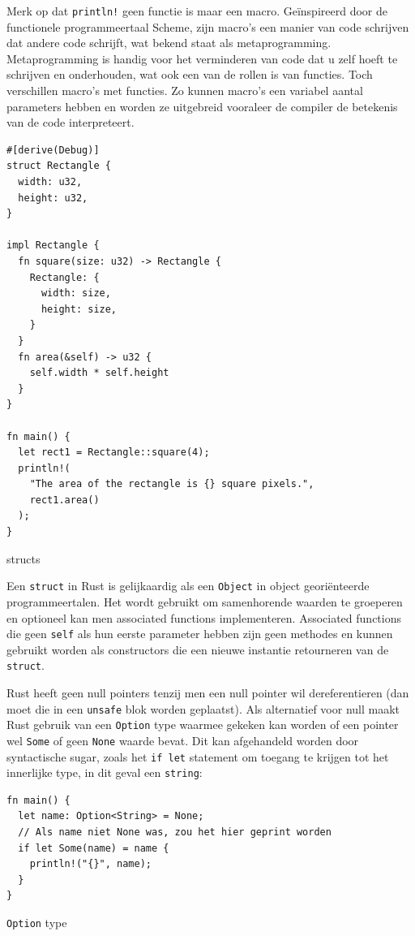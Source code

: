 \clearpage

Merk op dat \texttt{println!} geen functie is maar een macro. Geïnspireerd door de
functionele programmeertaal Scheme, zijn macro’s een manier van code schrijven dat andere code
schrijft, wat bekend staat als metaprogramming. Metaprogramming is handig voor het verminderen van
code dat u zelf hoeft te schrijven en onderhouden, wat ook een van de rollen is van functies. Toch
verschillen macro’s met functies. Zo kunnen macro’s een variabel aantal parameters hebben en worden
ze uitgebreid vooraleer de compiler de betekenis van de code interpreteert.

\begin{listing}[h]
\begin{verbatim}
#[derive(Debug)]
struct Rectangle {
  width: u32,
  height: u32,
}

impl Rectangle {
  fn square(size: u32) -> Rectangle {
    Rectangle: {
      width: size,
      height: size,
    }
  }
  fn area(&self) -> u32 {
    self.width * self.height
  }
}

fn main() {
  let rect1 = Rectangle::square(4);
  println!(
    "The area of the rectangle is {} square pixels.",
    rect1.area()
  );
}

\end{verbatim}
\caption{structs}
\end{listing}

Een \texttt{struct} in Rust is gelijkaardig als een \texttt{Object} in object
georiënteerde programmeertalen. Het wordt gebruikt om samenhorende waarden te groeperen en optioneel
kan men associated functions implementeren. Associated functions die geen \texttt{self}
als hun eerste parameter hebben zijn geen methodes en kunnen gebruikt worden als constructors die
een nieuwe instantie retourneren van de \texttt{struct}.

Rust heeft geen null pointers tenzij men een null pointer wil dereferentieren (dan moet die in een
\texttt{unsafe} blok worden geplaatst). Als alternatief voor null maakt Rust gebruik van
een \texttt{Option} type waarmee gekeken kan worden of een pointer wel
\texttt{Some} of geen \texttt{None} waarde bevat. Dit kan afgehandeld worden
door syntactische sugar, zoals het \texttt{if let} statement om toegang te krijgen tot het
innerlijke type, in dit geval een \texttt{string}:

\begin{listing}[h]
\begin{verbatim}
fn main() {
  let name: Option<String> = None;
  // Als name niet None was, zou het hier geprint worden
  if let Some(name) = name {
    println!("{}", name);
  }
}
\end{verbatim}
\caption{\texttt{Option} type}
\end{listing}

